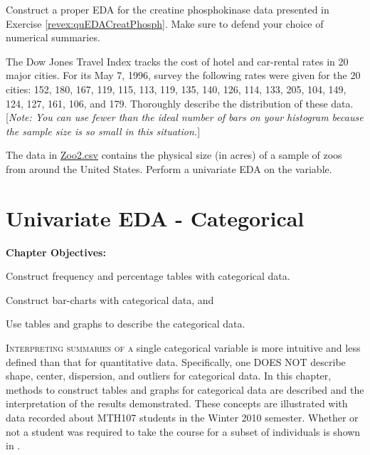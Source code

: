 \documentclass[10pt,openany]{book}\usepackage[]{graphicx}\usepackage[]{color}
\begin{document}
\newpage
\begin{exsection}
  \item \label{revex:quEDACP} \rhw{} Construct a proper EDA for the creatine phosphokinase data presented in Exercise \ref{revex:quEDACreatPhosph}.  Make sure to defend your choice of numerical summaries.  
  \item \label{revex:quEDADJTI} \rhw{} \hspace{12pt} The Dow Jones Travel Index tracks the cost of hotel and car-rental rates in 20 major cities.  For its May 7, 1996, survey the following rates were given for the 20 cities: 152, 180, 167, 119, 115, 113, 119, 135, 140, 126, 114, 133, 205, 104, 149, 124, 127, 161, 106, and 179.  Thoroughly describe the distribution of these data.  [\textit{Note: You can use fewer than the ideal number of bars on your histogram because the sample size is so small in this situation.}] 
  \item \label{revex:quEDAZoo2} \rhw{} The data in \href{https://raw.githubusercontent.com/droglenc/NCData/master/Zoo2.csv}{Zoo2.csv} contains the physical size (in acres) of a sample of zoos from around the United States.  Perform a univariate EDA on the  variable. 
\end{exsection}



\chapter{Univariate EDA - Categorical} \label{chap:UnivEDACat}
\begin{ChapObj}{\boxwidth}
  \textbf{Chapter Objectives:}
  \begin{Enumerate}
    \item Construct frequency and percentage tables with categorical data.
    \item Construct bar-charts with categorical data, and
    \item Use tables and graphs to describe the categorical data.
  \end{Enumerate}
\end{ChapObj}

\minitoc
\vspace{24pt}

\lettrine{I}{nterpreting summaries of a} single categorical variable is more intuitive and less defined than that for quantitative data.  Specifically, one DOES NOT describe shape, center, dispersion, and outliers for categorical data.  In this chapter, methods to construct tables and graphs for categorical data are described and the interpretation of the results demonstrated.  These concepts are illustrated with data recorded about MTH107 students in the Winter 2010 semester.  Whether or not a student was required to take the course for a subset of individuals is shown in .
\end{document}
